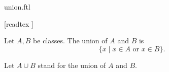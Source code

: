 \documentclass{stex}
\begin{document}
\begin{smodule}{union.ftl}

  \begin{forthel}

    [readtex ]
  \end{forthel}

  \begin{forthel}
    \begin{definition}
      Let $A, B$ be classes.
      The union of $A$ and $B$ is
      \[ \{ x \mid \text{$x \in A$ or $x \in B$} \}. \]
    \end{definition}

    Let $A \cup B$ stand for the union of $A$ and $B$.
  \end{forthel}
\end{smodule}
\end{document}
